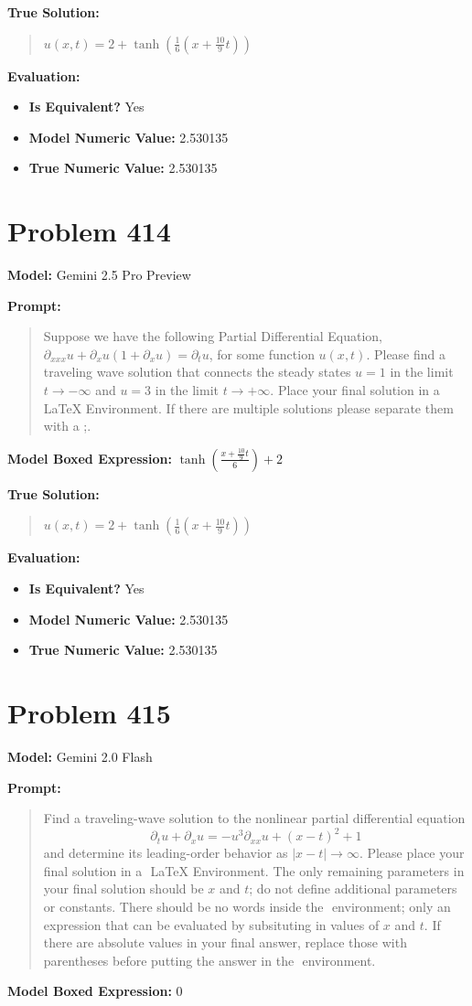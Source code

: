 \documentclass{article}
\begin{document}
\textbf{True Solution:}
\begin{quote}
$u(x,t) = 2+\tanh(\frac{1}{6}(x+\frac{10}{9}t))$
\end{quote}

\textbf{Evaluation:}
\begin{itemize}
\item \textbf{Is Equivalent?} Yes
\item \textbf{Model Numeric Value:} 2.530135
\item \textbf{True Numeric Value:} 2.530135
\end{itemize}
\vspace{1cm}
\section*{Problem 414}
\textbf{Model:} Gemini 2.5 Pro Preview

\textbf{Prompt:}
\begin{quote}
Suppose we have the following Partial Differential Equation, $\partial_{xxx}u + \partial_xu(1+\partial_xu) = \partial_tu$, for some function $u(x,t)$. Please find a traveling wave solution that connects the steady states $u = 1$ in the limit $t \rightarrow -\infty $ and $u = 3$ in the limit $t \rightarrow +\infty$. Place your final solution in a $\boxed{}$ LaTeX Environment. If there are multiple solutions please separate them with a ;.
\end{quote}
\textbf{Model Boxed Expression:} $\tanh\left(\frac{x+\frac{10}{9}t}{6}\right)+2$

\textbf{True Solution:}
\begin{quote}
$u(x,t) = 2+\tanh(\frac{1}{6}(x+\frac{10}{9}t))$
\end{quote}

\textbf{Evaluation:}
\begin{itemize}
\item \textbf{Is Equivalent?} Yes
\item \textbf{Model Numeric Value:} 2.530135
\item \textbf{True Numeric Value:} 2.530135
\end{itemize}
\vspace{1cm}
\section*{Problem 415}
\textbf{Model:} Gemini 2.0 Flash

\textbf{Prompt:}
\begin{quote}
Find a traveling-wave solution to the nonlinear partial differential equation $$\partial_t u + \partial_x u = -u^3 \partial_{xx}u + (x-t)^2 + 1$$ and determine its leading-order behavior as $|x-t| \to \infty$. Please place your final solution in a $\boxed{}$ LaTeX Environment. The only remaining parameters in your final solution should be $x$ and $t$; do not define additional parameters or constants. There should be no words inside the $\boxed{}$ environment; only an expression that can be evaluated by subsituting in values of $x$ and $t$. If there are absolute values in your final answer, replace those with parentheses before putting the answer in the $\boxed{}$ environment.
\end{quote}
\textbf{Model Boxed Expression:} $0$
\end{document}
